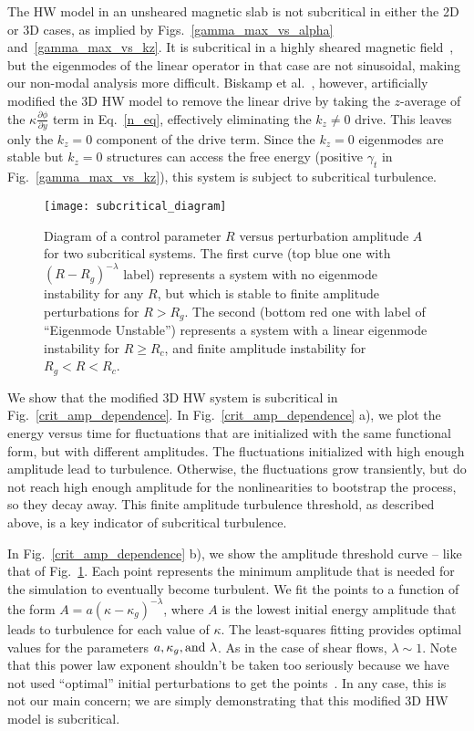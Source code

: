 \documentclass[twocolumn,showkeys,superscriptaddress]{revtex4}
\newcommand{\pdiff}[2]{\frac{\partial#1}{\partial#2}}
\begin{document}
The HW model in an unsheared magnetic slab is not subcritical in either the 2D or 3D cases, as implied by Figs.~\ref{gamma_max_vs_alpha} and~\ref{gamma_max_vs_kz}. It is subcritical in a highly sheared
magnetic field~\cite{drake1995}, but the eigenmodes of the linear operator in that case are not sinusoidal, making our non-modal analysis more difficult. 
Biskamp et al.~\cite{biskamp1995}, however, artificially modified the
3D HW model to remove the linear drive by taking the $z$-average of the $\kappa \pdiff{\phi}{y}$ term in Eq.~\ref{n_eq}, effectively eliminating the $k_z \ne 0$ drive. This leaves only the $k_z = 0$
component of the drive term. Since the $k_z = 0$ eigenmodes are stable but $k_z = 0$ structures can access the free energy (positive $\gamma_t$ in Fig.~\ref{gamma_max_vs_kz}), this system is subject
to subcritical turbulence.

\begin{figure}
\centerline{\texttt{[image: subcritical\_diagram]}}
\caption{Diagram of a control parameter $R$ versus perturbation amplitude $A$ for two subcritical systems. The first curve (top blue one with $(R-R_g)^{-\lambda}$ label) represents a system with no
eigenmode instability for any $R$, but which is stable to finite amplitude perturbations for $R > R_g$. 
The second (bottom red one with label of ``Eigenmode Unstable'') represents a system with a linear eigenmode instability for $R \ge R_c$, and finite amplitude
instability for $R_g < R < R_c$.}
\label{subcritical_diagram}
\end{figure}

We show that the modified 3D HW system is subcritical in Fig.~\ref{crit_amp_dependence}. In Fig.~\ref{crit_amp_dependence} a), we plot the energy versus time for fluctuations that are initialized with the same functional form, but with
different amplitudes.
The fluctuations initialized with high enough amplitude lead to turbulence. 
Otherwise, the fluctuations grow transiently, but do not reach high enough amplitude for the nonlinearities to bootstrap the process, so they decay away. 
This finite amplitude turbulence threshold, as described above, is a key indicator of subcritical turbulence.

In Fig.~\ref{crit_amp_dependence} b), we show the amplitude threshold curve -- like that of Fig.~\ref{subcritical_diagram}. Each point represents the minimum amplitude that is needed for the simulation to eventually become
turbulent. We fit the points to a function of the form $A = a (\kappa - \kappa_g)^{- \lambda}$, 
where $A$ is the lowest initial energy amplitude that leads to turbulence for each value of $\kappa$. The least-squares fitting provides optimal values for the parameters $a, \kappa_g, \rm{and} \ \lambda$. 
As in the case of shear flows, $\lambda \sim 1$. Note that this power law exponent shouldn't be taken too seriously because we have not used ``optimal'' initial perturbations to get the points~\cite{cossu2005}. 
In any case, this is not our main concern; we are simply demonstrating that this modified 3D HW model is subcritical.
\end{document}
